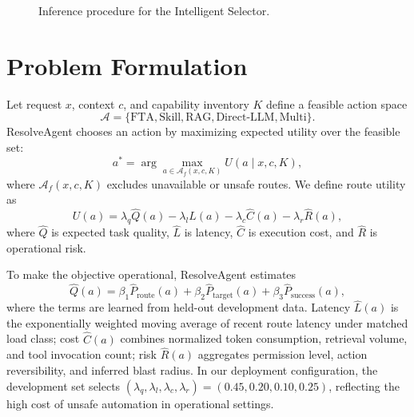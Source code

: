 \documentclass[conference]{IEEEtran}
\begin{document}
\begin{figure}[t]
\centering
\small
{}
\caption{Inference procedure for the Intelligent Selector.}
\label{fig:algorithm}
\end{figure}

\section{Problem Formulation}
Let request $x$, context $c$, and capability inventory $K$ define a feasible action space
\begin{equation}
\mathcal{A}=\{\mathrm{FTA},\mathrm{Skill},\mathrm{RAG},\mathrm{Direct\mbox{-}LLM},\mathrm{Multi}\}.
\end{equation}
ResolveAgent chooses an action by maximizing expected utility over the feasible set:
\begin{equation}
a^*=\arg\max_{a\in\mathcal{A}_f(x,c,K)} U(a\mid x,c,K),
\end{equation}
where $\mathcal{A}_f(x,c,K)$ excludes unavailable or unsafe routes. We define route utility as
\begin{equation}
U(a)=\lambda_q \hat{Q}(a)-\lambda_l \hat{L}(a)-\lambda_c \hat{C}(a)-\lambda_r \hat{R}(a),
\end{equation}
where $\hat{Q}$ is expected task quality, $\hat{L}$ is latency, $\hat{C}$ is execution cost, and $\hat{R}$ is operational risk.

To make the objective operational, ResolveAgent estimates
\begin{equation}
\hat{Q}(a)=\beta_1 \hat{P}_{\mathrm{route}}(a)+\beta_2 \hat{P}_{\mathrm{target}}(a)+\beta_3 \hat{P}_{\mathrm{success}}(a),
\end{equation}
where the terms are learned from held-out development data. Latency $\hat{L}(a)$ is the exponentially weighted moving average of recent route latency under matched load class; cost $\hat{C}(a)$ combines normalized token consumption, retrieval volume, and tool invocation count; risk $\hat{R}(a)$ aggregates permission level, action reversibility, and inferred blast radius. In our deployment configuration, the development set selects $(\lambda_q,\lambda_l,\lambda_c,\lambda_r)=(0.45,0.20,0.10,0.25)$, reflecting the high cost of unsafe automation in operational settings.
\end{document}
